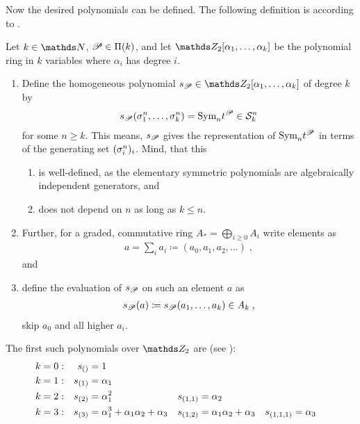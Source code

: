 Now the desired polynomials can be defined.
The following definition is according to \cite[p.~90]{milnorlectures}.
\begin{Def}
  Let $k\in\Nat$, $\mathscr{P}\in\Pi({k})$, and let
  $\Zmod2[\alpha_1,\dotsc,\alpha_k]$ be the polynomial ring in $k$
  variables where $\alpha_i$ has degree $i$.
  \begin{enumerate}
  \item
    Define the homogeneous polynomial
    $\s{\Part}\in\Zmod2[\alpha_1,\dotsc,\alpha_k]$ of degree $k$ by
    \begin{gather*}
      s_{\mathscr{P}}(\sigma_{1}^{n},\dotsc, \sigma_{k}^{n}) = \text{\normalfont Sym}_{n} t^{\mathscr{P}} \in \mathcal{S}^{n}_k
    \end{gather*}
    for some $n\geq k$. This means, $s_{\mathscr{P}}$ gives the representation
    of $\text{\normalfont Sym}_{n}t^{\mathscr{P}}$ in terms of the generating set $(\sigma_{i}^{n})_i$.
    Mind, that this
    \begin{enumerate}
    \item is well-defined, as the elementary symmetric
      polynomials are algebraically independent generators, and
    \item does not depend on $n$ as long as $k\leq n$.
    \end{enumerate}
  \item 
    Further, for a graded, commutative ring $A_*=\bigoplus_{i\geq 0}
    A_i$ write elements as
    \begin{gather*}
      a=\sum_i a_i \coloneqq (a_0,a_1,a_2,\dotsc)
      \;,
    \end{gather*}
    and
  \item 
    define the evaluation of $s_{\mathscr{P}}$ on such an element $a$ as
    \begin{gather*}
      s_{\mathscr{P}}(a) \coloneqq s_{\mathscr{P}}(a_1,\dotsc,a_k)
      \in A_k
      \;,
    \end{gather*}
    \idest skip $a_0$ and all higher $a_i$.
  \end{enumerate}
\end{Def}

\begin{Ex}
  The first such polynomials over $\Zmod2$ are
  (see \cite[p.~90]{milnorlectures}):
  \begin{align*}
    k&=0:
    &s_{()} &= 1
    \\ k&=1:
    &s_{(1)} &= \alpha_1
    \\ k&=2:
    &s_{(2)} &= \alpha_1^2
        &s_{(1,1)} &= \alpha_2
    \\ k&=3:
    &s_{(3)} &= \alpha_1^3 + \alpha_1\alpha_2 + \alpha_3
        &s_{(1,2)} &= \alpha_1\alpha_2 + \alpha_3
             &s_{(1,1,1)} &= \alpha_3
  \end{align*}
\end{Ex}

